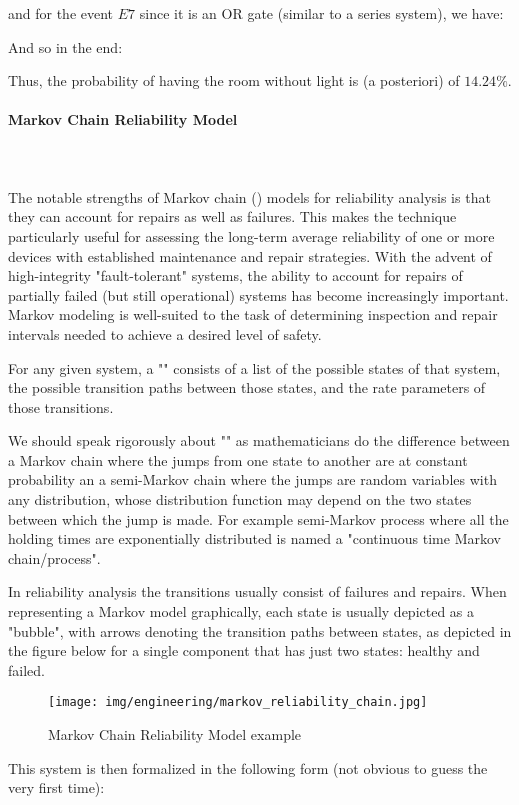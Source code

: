 	and for the event $E7$ since it is an OR gate (similar to a series system), we have:
	
	And so in the end:
	
	Thus, the probability of having the room without light is (a posteriori) of $14.24\%$.
	
	\paragraph{Markov Chain Reliability Model}\mbox{}\\\\
	The notable strengths of Markov chain () models for reliability analysis is that they can account for repairs as well as failures. This makes the technique particularly useful for assessing the long-term average reliability of one or more devices with established maintenance and repair strategies.  With the advent of high-integrity "fault-tolerant" systems, the ability to account for repairs of partially failed (but still operational) systems has become increasingly important. Markov modeling is well-suited to the task of determining inspection and repair intervals needed to achieve a desired level of safety.

	For any given system, a "" consists of a list of the possible states of that system, the possible transition paths between those states, and the rate parameters of those transitions. 
	\begin{tcolorbox}[title=Remark,colframe=black,arc=10pt]
	We should speak rigorously about "" as mathematicians do the difference between a Markov chain where the jumps from one state to another are at constant probability an a semi-Markov chain where the jumps are random variables with any distribution, whose distribution function may depend on the two states between which the jump is made. For example semi-Markov process where all the holding times are exponentially distributed is named a "continuous time Markov chain/process".
	\end{tcolorbox}	
	In reliability analysis the transitions usually consist of failures and repairs. When representing a Markov model graphically, each state is usually depicted as a "bubble", with arrows denoting the transition paths between states, as depicted in the figure below for a single component that has just two states: healthy and failed.
	\begin{figure}[H]
		\centering
		\texttt{[image: img/engineering/markov\_reliability\_chain.jpg]}	
		\caption{Markov Chain Reliability Model example}
	\end{figure}
	This system is then formalized in the following form (not obvious to guess the very first time):
	
